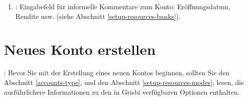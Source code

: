 \begin{enumerate}
\begin{itemize}
		\item {}: Der Mindestsaldo, den Sie aufrechterhalten möchten; damit die Farbcodierung des Saldos auf der  ordnungsgemäß funktioniert, muss dieser größer oder gleich dem genehmigten Mindestsaldo sein.
	\end{itemize}	
	\item {}: Eingabefeld für informelle Kommentare zum Konto: Eröffnungsdatum, Rendite usw. (siehe Abschnitt \vref{setup-resources-banks}).
\end{enumerate}

\section{Neues Konto erstellen\label{accounts-new}}%


\Note{}: Bevor Sie mit der Erstellung eines neuen Kontos beginnen, sollten Sie den Abschnitt \vref{accounts-type},  und den Abschnitt \vref{setup-resources-modes},  lesen, die ausführlichere Informationen zu den in Grisbi verfügbaren Optionen enthalten.


